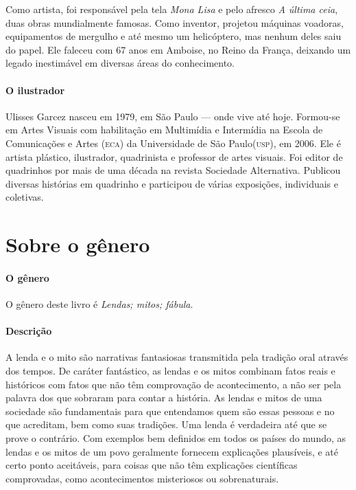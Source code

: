 \documentclass[11pt]{extarticle}
\begin{document}

Como artista, foi responsável pela tela \textit{Mona Lisa} e pelo afresco \textit{A última ceia}, duas obras mundialmente famosas. Como inventor, projetou máquinas voadoras, equipamentos de mergulho e até mesmo um helicóptero, mas nenhum deles saiu do papel. Ele faleceu com 67 anos em Amboise, no Reino da França, deixando um legado inestimável em diversas áreas do conhecimento.

\paragraph{O ilustrador} Ulisses Garcez nasceu em 1979, em São Paulo --- onde vive até hoje. Formou-se em Artes Visuais com habilitação em Multimídia e Intermídia na Escola de Comunicações e Artes (\textsc{eca}) da Universidade de São Paulo(\textsc{usp}), em 2006. Ele é artista plástico, ilustrador, quadrinista e professor de artes visuais. Foi editor de quadrinhos por mais de uma década na revista Sociedade Alternativa. Publicou diversas histórias em quadrinho e participou de várias exposições, individuais e coletivas.


\section{Sobre o gênero}

\paragraph{O gênero} O gênero deste livro é \textit{Lendas; mitos; fábula}. 

\paragraph{Descrição} A lenda e o mito são narrativas fantasiosas transmitida pela tradição oral através dos tempos. De caráter fantástico, as lendas e os mitos combinam fatos reais e históricos com fatos que não têm comprovação de acontecimento, a não ser pela palavra dos que sobraram para contar a história. As lendas e mitos de uma sociedade são fundamentais para que entendamos quem são essas pessoas e no que acreditam, bem como suas tradições. Uma lenda é verdadeira até que se prove o contrário. Com exemplos bem definidos em todos os países do mundo, as lendas e os mitos de um povo geralmente fornecem explicações plausíveis, e até certo ponto aceitáveis, para coisas que não têm explicações científicas comprovadas, como acontecimentos misteriosos ou sobrenaturais.
\end{document}

